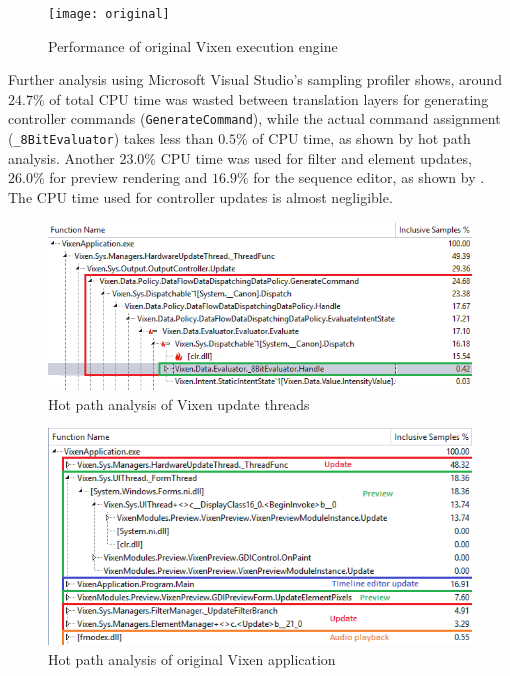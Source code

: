 \begin{figure}[t]
  \centering
  \texttt{[image: original]}
  \caption{\footnotesize Performance of original Vixen execution engine}
  \label{fig:original}
\end{figure}

Further analysis using Microsoft Visual Studio's sampling profiler shows, around $24.7 \%$ of total CPU time was wasted between translation layers for generating controller commands (\texttt{GenerateCommand}), while the actual command assignment (\texttt{\_8BitEvaluator}) takes less than $0.5 \%$ of CPU time, as shown by  hot path analysis. Another $23.0 \%$ CPU time was used for filter and element updates, $26.0 \%$ for preview rendering and $16.9 \%$ for the sequence editor, as shown by . The CPU time used for controller updates is almost negligible.

\begin{figure}[t]
  \centering
  \includegraphics[width=0.85\columnwidth]{Figs/vixen_perf_original.png}
  \caption{\footnotesize Hot path analysis of Vixen update threads}
  \label{fig:vixen_perf_original}
\end{figure}

\begin{figure}[t]
  \centering
  \includegraphics[width=0.85\columnwidth]{Figs/vixen_perf_original_overview.png}
  \caption{\footnotesize Hot path analysis of original Vixen application}
  \label{fig:vixen_perf_original_overview}
\end{figure}

